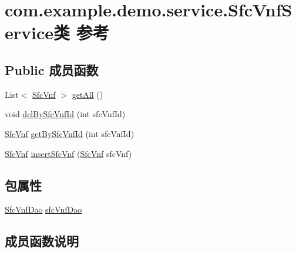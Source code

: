 \hypertarget{classcom_1_1example_1_1demo_1_1service_1_1_sfc_vnf_service}{}\section{com.\+example.\+demo.\+service.\+Sfc\+Vnf\+Service类 参考}
\label{classcom_1_1example_1_1demo_1_1service_1_1_sfc_vnf_service}
\subsection*{Public 成员函数}
\begin{DoxyCompactItemize}
\item 
List$<$ \mbox{\hyperlink{classcom_1_1example_1_1demo_1_1modular_1_1_sfc_vnf}{Sfc\+Vnf}} $>$ \mbox{\hyperlink{classcom_1_1example_1_1demo_1_1service_1_1_sfc_vnf_service_ad643a49dab1e2d034e4c5c9fd2129430}{get\+All}} ()
\item 
void \mbox{\hyperlink{classcom_1_1example_1_1demo_1_1service_1_1_sfc_vnf_service_aa563b555c9cf94222686ea57d8222ad0}{del\+By\+Sfc\+Vnf\+Id}} (int sfc\+Vnf\+Id)
\item 
\mbox{\hyperlink{classcom_1_1example_1_1demo_1_1modular_1_1_sfc_vnf}{Sfc\+Vnf}} \mbox{\hyperlink{classcom_1_1example_1_1demo_1_1service_1_1_sfc_vnf_service_a27b15b6033d0959623e3afc8cddd05cf}{get\+By\+Sfc\+Vnf\+Id}} (int sfc\+Vnf\+Id)
\item 
\mbox{\hyperlink{classcom_1_1example_1_1demo_1_1modular_1_1_sfc_vnf}{Sfc\+Vnf}} \mbox{\hyperlink{classcom_1_1example_1_1demo_1_1service_1_1_sfc_vnf_service_a64078d44faf4bb17cbaabc38237bc572}{insert\+Sfc\+Vnf}} (\mbox{\hyperlink{classcom_1_1example_1_1demo_1_1modular_1_1_sfc_vnf}{Sfc\+Vnf}} sfc\+Vnf)
\end{DoxyCompactItemize}
\subsection*{包属性}
\begin{DoxyCompactItemize}
\item 
\mbox{\hyperlink{interfacecom_1_1example_1_1demo_1_1dao_1_1_sfc_vnf_dao}{Sfc\+Vnf\+Dao}} \mbox{\hyperlink{classcom_1_1example_1_1demo_1_1service_1_1_sfc_vnf_service_a3ce99d0379de854e63812b0f3012c14a}{sfc\+Vnf\+Dao}}
\end{DoxyCompactItemize}


\subsection{成员函数说明}
\mbox{\label{classcom_1_1example_1_1demo_1_1service_1_1_sfc_vnf_service_aa563b555c9cf94222686ea57d8222ad0}} 
